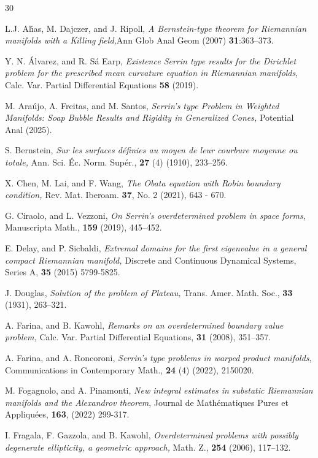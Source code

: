 \documentclass[12pt]{amsart}
\theoremstyle{plain}
\numberwithin{equation}{section}
\begin{document}

\begin{thebibliography}{30}

 L.J. Al\'{\i}as, M. Dajczer, and J. Ripoll, {\emph{A Bernstein-type theorem for Riemannian manifolds
with a Killing field,}}Ann Glob Anal Geom (2007) {\bf 31}:363–373.


 Y. N. Álvarez, and R. Sá Earp, 
\emph{Existence Serrin type results for the Dirichlet problem for the prescribed mean curvature equation in Riemannian manifolds}, 
Calc. Var. Partial Differential Equations {\bf 58} (2019).

 M. Araújo, A. Freitas, and M. Santos, \emph{ Serrin’s type Problem in Weighted Manifolds: Soap Bubble Results and Rigidity in Generalized Cones,} Potential Anal (2025).

 S. Bernstein, \emph{Sur les surfaces définies au moyen de leur courbure moyenne ou totale,} Ann. Sci.
Éc. Norm. Supér., {\bf 27} (4) (1910), 233--256.


 X. Chen, M. Lai, and F. Wang, \emph{The Obata equation with Robin boundary condition,} Rev. Mat. Iberoam. {\bf 37}, No. 2 (2021), 643 - 670.

 G. Ciraolo, and L. Vezzoni, \emph{On Serrin’s overdetermined problem in space forms,} Manuscripta Math., {\bf 159} (2019), 445–452.

 E. Delay, and P. Sicbaldi, \emph{Extremal domains for the first eigenvalue in a general compact
Riemannian manifold,} Discrete and Continuous Dynamical Systems, Series A, {\bf 35} (2015)
5799-5825.


 J. Douglas, \emph{Solution of the problem of Plateau,} Trans. Amer. Math. Soc., {\bf 33} (1931), 263–321.

 A. Farina, and B. Kawohl, \emph{Remarks on an overdetermined boundary value problem,} Calc. Var. Partial Differential Equations, {\bf 31} (2008), 351--357.

 A. Farina, and A. Roncoroni, \emph{Serrin’s type problems in warped product manifolds}, Communications in Contemporary Math., {\bf 24} (4) (2022), 2150020.

M. Fogagnolo, and A. Pinamonti,\emph{ New integral estimates in substatic Riemannian manifolds and the Alexandrov theorem}, Journal de Mathématiques Pures et Appliquées, {\bf 163}, (2022) 299-317.

 I. Fragala, F. Gazzola, and B. Kawohl, \emph{Overdetermined problems with possibly degenerate ellipticity, a geometric approach,} Math. Z., {\bf 254} (2006), 117--132.


\end{thebibliography}
\end{document}
